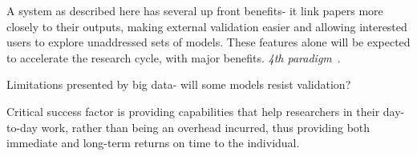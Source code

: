 \documentclass[conference]{IEEEtran}
\begin{document}
A system as described here has several up front benefits- it link papers 
more closely to their outputs, making external validation easier and 
allowing interested users to explore unaddressed sets of models. These 
features alone will be expected to accelerate the research cycle, with
major benefits. \emph{4th paradigm}~\cite{hey:2009}.

Limitations presented by big data- will some models resist validation?

Critical success factor is providing capabilities that help researchers 
in their day-to-day work, rather than being an overhead incurred, thus 
providing both immediate and long-term returns on time to the individual.





\end{document}
